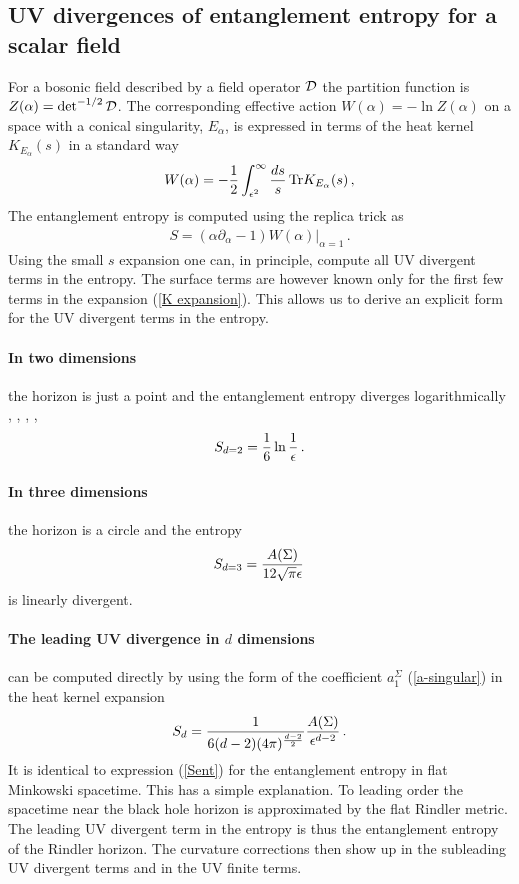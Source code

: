 \documentclass[12pt]{article}
\def\tr{\hbox{Tr}}
\def\be{\begin{eqnarray}}
\def\ee{\end{eqnarray}}
\def\lb{\label}
\def\o{\over}
\begin{document}
\subsection{UV divergences of entanglement entropy for a  scalar field}
\label{section: UV-divergences}

For a bosonic field described by a field operator $\cal D$ the partition function is $Z(\alpha)=\det^{-1/2} {\cal D}$. The corresponding effective action $W(\alpha)=-\ln Z(\alpha)$ on a space with a conical singularity, $E_\alpha$, is expressed in terms of the heat kernel $K_{E_\alpha}(s)$ in a standard way
\be
W(\alpha)=-{1\over 2}\int_{\epsilon^2}^\infty {ds\o s}\, \tr K_{E_\alpha}(s)\, ,
\lb{effective action}
\ee
The entanglement entropy is computed using the replica trick as
\be
S=(\alpha\partial_\alpha-1)W(\alpha)|_{\alpha=1}\, .
\label{entropy-BH}
\ee
Using the small $s$ expansion one can, in principle, compute all UV divergent terms in the entropy. The surface terms are however known only for the  first few  terms in the expansion (\ref{K expansion}). This allows us to derive an explicit form for the  UV divergent terms  in the entropy.

\paragraph*{In two dimensions} the horizon is just a point and the entanglement entropy diverges logarithmically  \cite{Callan:1994py}, \cite{Kabat:1994vj}, \cite{Dowker:1994fi}, \cite{Fiola:1994ir}, \cite{Solodukhin:1994yz}
\be
S_{d=2}={1\over 6}\ln{1\over \epsilon}\, .
\lb{2d-entropy}
\ee
\paragraph*{In three dimensions} the horizon is  a circle and the  entropy 
\be
S_{d=3}={A(\Sigma)\over 12\sqrt{\pi}\epsilon}\, 
\lb{3d-entropy}
\ee
is linearly divergent.

\paragraph*{The leading UV divergence in $d$ dimensions} can be computed directly by using the form of the coefficient $a_1^\Sigma$ (\ref{a-singular}) in  the  heat kernel expansion
\cite{Callan:1994py}
\be
S_{d}={1\over 6(d-2)(4\pi)^{d-2\o 2}}{A(\Sigma)\over \epsilon^{d-2}}\, .
\lb{entropy dimension d}
\ee
It is identical to expression (\ref{Sent}) for the entanglement entropy in flat Minkowski spacetime. This has a simple explanation.
To leading order the spacetime near the black hole horizon is approximated by the flat Rindler  metric. The leading UV divergent 
term in the entropy is thus the entanglement entropy of the Rindler horizon. The curvature corrections then show up in the subleading UV divergent terms and in the UV finite terms.
\end{document}

